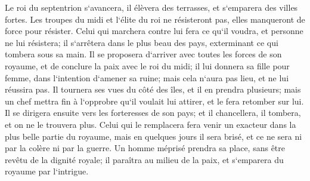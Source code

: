 \verse Le roi du septentrion s`avancera, il élèvera des terrasses, et s`emparera des villes fortes. Les troupes du midi et l`élite du roi ne résisteront pas, elles manqueront de force pour résister. 
\verse Celui qui marchera contre lui fera ce qu`il voudra, et personne ne lui résistera; il s`arrêtera dans le plus beau des pays, exterminant ce qui tombera sous sa main. 
\verse Il se proposera d`arriver avec toutes les forces de son royaume, et de conclure la paix avec le roi du midi; il lui donnera sa fille pour femme, dans l`intention d`amener sa ruine; mais cela n`aura pas lieu, et ne lui réussira pas. 
\verse Il tournera ses vues du côté des îles, et il en prendra plusieurs; mais un chef mettra fin à l`opprobre qu`il voulait lui attirer, et le fera retomber sur lui. 
\verse Il se dirigera ensuite vers les forteresses de son pays; et il chancellera, il tombera, et on ne le trouvera plus. 
\verse Celui qui le remplacera fera venir un exacteur dans la plus belle partie du royaume, mais en quelques jours il sera brisé, et ce ne sera ni par la colère ni par la guerre. 
\verse Un homme méprisé prendra sa place, sans être revêtu de la dignité royale; il paraîtra au milieu de la paix, et s`emparera du royaume par l`intrigue. 
